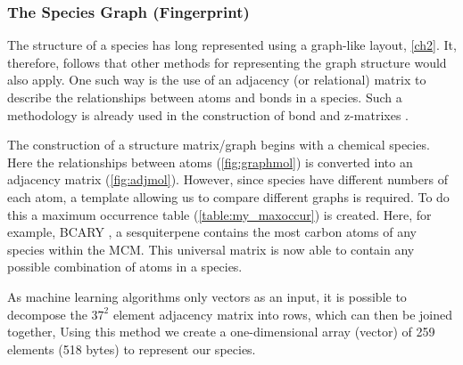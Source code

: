 \subsubsection{The Species Graph (Fingerprint)}\label{sec:specgraph}

The structure of a species has long represented using a graph-like layout, \autoref{ch2}. It, therefore, follows that other methods for representing the graph structure would also apply. One such way is the use of an adjacency (or relational) matrix to describe the relationships between atoms and bonds in a species. Such a methodology is already used in the construction of bond and z-matrixes \citep{mcmgen,zmatrix}.

The construction of a structure matrix/graph begins with a chemical species. Here the relationships between atoms (\autoref{fig:graphmol}) is converted into an adjacency matrix (\autoref{fig:adjmol}). However, since species have different numbers of each atom, a template allowing us to compare different graphs is required. To do this a maximum occurrence table (\autoref{table:my_maxoccur}) is created. Here, for example, BCARY , a sesquiterpene contains the most carbon atoms of any species within the MCM. This universal matrix is now able to contain any possible combination of atoms in a species.

As machine learning algorithms only vectors as an input, it is possible to decompose the $37^2$ element adjacency matrix into rows, which can then be joined together, Using this method we create a one-dimensional array (vector) of 259 elements (518 bytes) to represent our species.


